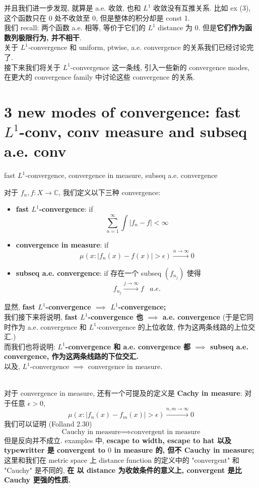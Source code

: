 \documentclass[lang=cn,11pt]{elegantbook}
\begin{document}
并且我们进一步发现, 就算是 a.e. 收敛, 也和 $L^1$ 收敛没有互推关系. 比如 ex (3), 这个函数只在 $0$ 处不收敛至 0, 但是整体的积分却是 const 1. \\
我们 recall: 两个函数 a.e. 相等, 等价于它们的 $L^1$ distance 为 0. 但是\textbf{它们作为函数列极限行为, 并不相干}.\\ 

关于 $L^1$-convergence 和 uniform, ptwise, a.e. convergence 的关系我们已经讨论完了. \\
接下来我们将关于 $L^1$-convergence 这一条线, 引入一些新的 convergence modes, 在更大的 convergence family 中讨论这些 convergence 的关系. 

\section{3 new modes of convergence: fast $L^1$-conv, conv measure and subseq a.e. conv}
\begin{definition}{fast $L^1$-convergence, convergence in measure, subseq a.e. convergence}

对于  $f_n,f:X \rightarrow \mathbb{C}$, 我们定义以下三种 convergence:
\begin{itemize}
    \item \textbf{fast $L^1$-convergence}: if  \[
    \sum_{n=1}^\infty \int |f_n - f| < \infty    
    \]
    \item \textbf{convergence in measure}: if \[
    \mu(x : |f_n(x) - f(x)| > \epsilon) \overset{n\to \infty}{\longrightarrow} 0
    \]
    \item \textbf{subseq a.e. convergence}: if 存在一个 subseq $(f_{n_j})$ 使得 \[
    f_{n_j} \overset{j\to \infty}{\longrightarrow} f \;\;\; a.e.
    \]
\end{itemize}
\end{definition}
显然, \textbf{fast $L^1$-convergence $\implies $ $L^1$-convergence;}\\
我们接下来将说明, \textbf{fast $L^1$-convergence 也 $\implies$ a.e. convergence} (于是它同时作为 a.e. convergence 和 $L^1$-convergence 的上位收敛, 作为这两条线路的上位交汇.)\\
而我们也将说明:  \textbf{$L^1$-convergence 和 a.e. convergence 都 $\implies$ subseq a.e. convergence, 作为这两条线路的下位交汇.}\\
以及, $L^1$-convergence $\implies$ convergence in measure.\\\\

\begin{remark}
    对于 convergence in measure, 还有一个可提及的定义是 \textbf{Cachy in measure}: 对于任意 $\epsilon>0$,  \[
    \mu(x : |f_n(x) - f_m(x)| > \epsilon) \overset{n,m\to \infty}{\longrightarrow} 0
    \]
    我们可以证明 (Folland 2.30)\[\text{Cauchy in measure} \implies \text{convergent in measure}\]
    但是反向并不成立. examples 中,\textbf{ escape to width, escape to hat 以及 typewritter 是 convergent to $0$ in measure 的, 但不 Cauchy in measure; }\\
    这里和我们在 metric space 上 distance function 的定义中的 "convergent" 和 "Cauchy" 是不同的, \textbf{在 以 distance 为收敛条件的意义上, convergent 是比 Cauchy 更强的性质.} 
\end{remark}
\end{document}
